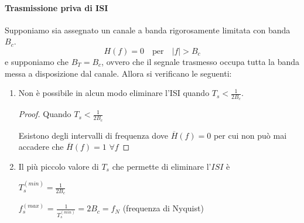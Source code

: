 \paragraph*{Trasmissione priva di ISI}
Supponiamo sia assegnato un canale a banda rigorosamente limitata con banda \( B_c \).
\[ H(f) = 0 \quad \text{per} \quad |f| > B_c \]
e supponiamo che \( B_T = B_c \), ovvero che il segnale trasmesso occupa tutta la banda messa a disposizione dal canale.
Allora si verificano le seguenti:
\begin{enumerate}
    \item Non è possibile in alcun modo eliminare l'ISI quando \( T_s < \frac{1}{2B_c} \).


          \begin{proof}
              Quando \( T_s < \frac{1}{2B_c} \)


              Esistono degli intervalli di frequenza dove \( \overline{H}(f) = 0 \) per cui non può mai accadere che \( \overline{H}(f) = 1 \) \( \forall f \)
          \end{proof}

          \bigskip

    \item Il più piccolo valore di \( T_s \) che permette di eliminare l'\( ISI \) è

          \( T_s^{(min)} = \frac{1}{2B_c} \)

          \bigskip

          \( f_s^{(max)}\) = \( \frac{1}{T_s^{(min)}} = 2B_c = f_N \) \quad (frequenza di Nyquist)

          \bigskip


\end{enumerate}
